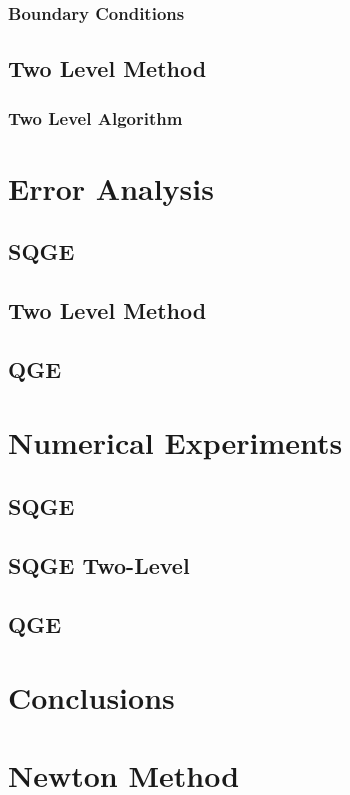 \documentclass{VTthesis}
\begin{document}
      \subsection{Boundary Conditions} \label{sse:BCs}
      
    \section{Two Level Method} \label{sec:TwoLevel}
    
      \subsection{Two Level Algorithm} \label{sse:Algorithm}
      

  \chapter{Error Analysis} \label{ch:Errors}
    \section{SQGE} \label{sec:SQGEErrors}
    
    \section{Two Level Method} \label{sse:SQGE2LE}
    
    \section{QGE} \label{sec:QGEError}
    

  \chapter{Numerical Experiments} \label{ch:Tests}
  \section{SQGE} \label{sec:SQGETests}
  
  \section{SQGE Two-Level} \label{sec:SQGE2LTests}
  
  \section{QGE} \label{sec:QGETests}
  

  \chapter{Conclusions} \label{ch:Conclusions}
  

  
  

  \appendix
  \chapter{Newton Method} \label{sec:Newton}
  
\end{document}
